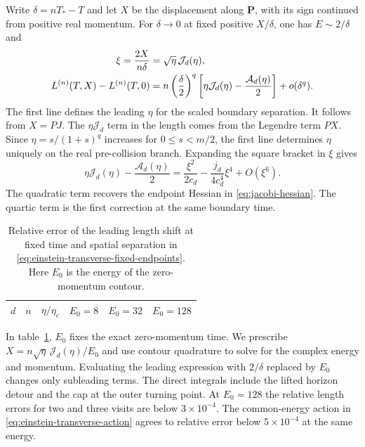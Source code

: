 Write \(\delta=nT_*-T\) and let \(X\) be the displacement
along \(\boldsymbol P\), with its sign continued from positive
real momentum. For \(\delta\to0\) at fixed positive \(X/\delta\),
one has \(E\sim 2/\delta\) and
\begin{align}
 \xi=\frac{2X}{n\delta}&=\sqrt\eta\,\mathcal J_d(\eta),
 \notag\\
 L^{(n)}(T,X)-L^{(n)}(T,0)
 &=n\left(\frac{\delta}{2}\right)^q
       \left[\eta\mathcal J_d(\eta)-\frac{\mathcal A_d(\eta)}2\right]
       +o(\delta^q).
 \label{eq:einstein-transverse-fixed-endpoints}
\end{align}
The first line defines the leading \(\eta\) for the scaled
boundary separation. It follows from
\(X=PJ\). The \(\eta\mathcal J_d\) term in the length comes from
the Legendre term \(PX\). Since \(\eta=s/(1+s)^q\) increases
for \(0\leq s<m/2\), the first line determines \(\eta\) uniquely
on the real pre-collision branch. Expanding the square bracket
in \(\xi\) gives
\begin{equation}
 \eta\mathcal J_d(\eta)-\frac{\mathcal A_d(\eta)}2
    =\frac{\xi^2}{2c_d}-\frac{j_d}{4c_d^4}\xi^4+O(\xi^6).
 \label{eq:einstein-transverse-quartic}
\end{equation}
The quadratic term recovers the endpoint Hessian in
\eqref{eq:jacobi-hessian}. The quartic term is the first
correction at the same boundary time.

\begin{table}[t]
 \centering\small
 \begin{tabular}{cccccc}
 \hline
 \(d\) & \(n\) & \(\eta/\eta_c\) & \(E_0=8\) & \(E_0=32\) & \(E_0=128\) \\
 \hline
 
 \end{tabular}
 \caption{Relative error of the leading length shift at fixed time and
 spatial separation in \eqref{eq:einstein-transverse-fixed-endpoints}.
 Here \(E_0\) is the energy of the zero-momentum contour.}
 \label{tab:einstein-transverse-geodesic}
\end{table}

In table~\ref{tab:einstein-transverse-geodesic}, \(E_0\) fixes the
exact zero-momentum time.
We prescribe \(X=n\sqrt\eta\,\mathcal J_d(\eta)/E_0\) and use
contour quadrature to solve for the complex energy and momentum.
Evaluating the leading expression with
\(2/\delta\) replaced by \(E_0\) changes only subleading terms.
The direct integrals include the lifted horizon detour and the
cap at the outer turning point. At \(E_0=128\) the relative
length errors for two and three visits are below \(3\times10^{-4}\).
The common-energy action in \eqref{eq:einstein-transverse-action}
agrees to relative error below \(5\times10^{-4}\) at the same energy.


